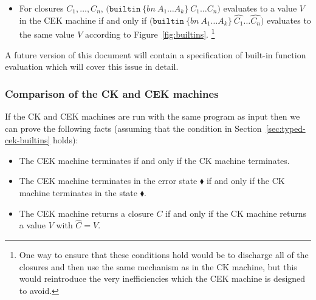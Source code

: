 \documentclass[a4paper]{article}
\newcommand{\keyword}[1]{\texttt{#1}}
\newcommand{\construct}[1]{\texttt{(} #1 \texttt{)}}
\newcommand\discharge[1]{\widehat{#1}}
\newcommand{\builtin}[3]{\construct{\keyword{builtin} ~ \texttt{\{} \mathit{#1} ~ #2 \texttt{\}} ~ #3}}
\begin{document}
\begin{appendices}
\begin{itemize}
\item For closures $C_1, \ldots, C_n$,
  $\builtin{bn}{A_1 \ldots A_k}{C_1 \ldots C_n}$
evaluates to a value $V$ in the CEK machine if and only if 
  $\builtin{bn}{A_1 \ldots A_k}{\discharge{C_1} \ldots \discharge{C_n}}$
evaluates to the same value $V$ according to Figure~\ref{fig:builtins}.%
\footnote{One way to ensure that these conditions hold would be to discharge all of the
closures and then use the same mechanism as in the CK machine, but this would
reintroduce the very inefficiencies which the CEK machine is designed to avoid.}

\end{itemize}
A future version of this document will contain a
specification of built-in function evaluation which will cover this
issue in detail.



\subsubsection{Comparison of the CK and CEK machines}
If the CK and CEK machines are run with the same program as input then
we can prove the following facts (assuming that the condition in
Section~\ref{sec:typed-cek-builtins} holds):
\begin{itemize}
\item The CEK machine terminates if and only if the CK machine terminates.
\item The CEK machine terminates in the error state $\blacklozenge$ if
and only if the CK machine terminates in the state $\blacklozenge$.
\item The CEK machine returns a closure $C$ if and only if the CK machine returns a
value $V$ with $\discharge{C} = V$.
\end{itemize}


\end{appendices}
\end{document}
